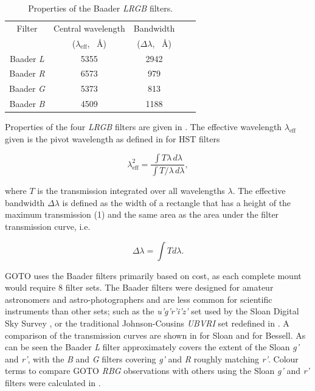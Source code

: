 \begin{colsection}
\begin{colsection}
\begin{table}[t]
    \begin{center}
        \begin{tabular}{c|cccc} %
            Filter            & Central wavelength                          & Bandwidth            \\
             & ($\lambda_\text{eff}$, \SI{}{\angstrom}) & ($\Delta\lambda$, \SI{}{\angstrom}) \\
            \midrule
            Baader \textit{L} & 5355 & 2942 \\
            Baader \textit{R} & 6573 &  979 \\
            Baader \textit{G} & 5373 &  813 \\
            Baader \textit{B} & 4509 & 1188 \\
        \end{tabular}
    \end{center}
    \caption[Baader filter properties]{
        Properties of the Baader \textit{LRGB} filters.
    }\label{tab:filters}
\end{table}

Properties of the four \textit{LRGB} filters are given in . The effective wavelength $\lambda_\text{eff}$ given is the pivot wavelength as defined in \citet{HST_calibration} for HST filters

\begin{equation}
    \lambda_\text{eff}^2 = \frac{\int T\lambda \, d\lambda}{\int T/\lambda \, d\lambda},
    \label{eq:pivot_wavelength}
\end{equation}

where $T$ is the transmission integrated over all wavelengths $\lambda$. The effective bandwidth $\Delta\lambda$ is defined as the width of a rectangle that has a height of the maximum transmission (1) and the same area as the area under the filter transmission curve, i.e.

\begin{equation}
    \Delta\lambda = \int T d\lambda.
    \label{eq:bandwidth}
\end{equation}

GOTO uses the Baader filters primarily based on cost, as each complete mount would require 8 filter sets. The Baader filters were designed for amateur astronomers and astro-photographers and are less common for scientific instruments than other sets; such as the \textit{u'g'r'i'z'} set used by the Sloan Digital Sky Survey \citep{Sloan_filters}, or the traditional Johnson-Cousins \textit{UBVRI} set redefined in \citet{Bessell_filters}. A comparison of the transmission curves are shown in  for Sloan and  for Bessell. As can be seen the Baader \textit{L} filter approximately covers the extent of the Sloan \textit{g'} and \textit{r'}, with the \textit{B} and \textit{G} filters covering \textit{g'} and \textit{R} roughly matching \textit{r'}. Colour terms to compare GOTO \textit{RBG} observations with others using the Sloan \textit{g'} and \textit{r'} filters were calculated in \citet{Phaethon}.


\end{colsection}
\end{colsection}

